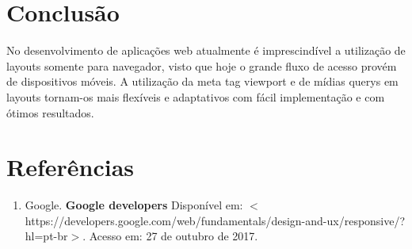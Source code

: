 \documentclass[12pt,a4paper]{article}
\begin{document}
\section{Conclusão}
No desenvolvimento de aplicações web atualmente é imprescindível a utilização de layouts somente para navegador, visto que hoje o grande fluxo de acesso provém de dispositivos móveis. A utilização da meta tag viewport e  de mídias querys em layouts tornam-os mais flexíveis e adaptativos com fácil implementação e com ótimos resultados.

\section{Referências}
\begin{enumerate}

\item Google. \textbf{Google developers} Disponível em: $<$https://developers.google.com/web/fundamentals/design-and-ux/responsive/?hl=pt-br$>$. Acesso em: 27 de outubro de 2017.

\end{enumerate}
\end{document}
